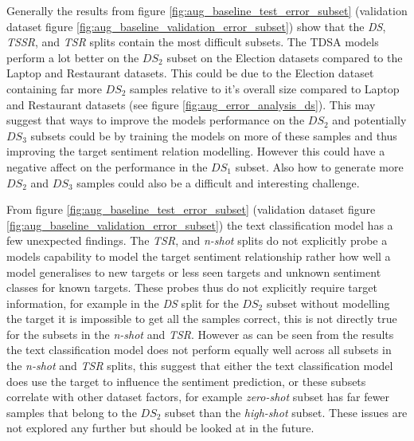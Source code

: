 Generally the results from figure \ref{fig:aug_baseline_test_error_subset} (validation dataset figure \ref{fig:aug_baseline_validation_error_subset}) show that the \textit{DS}, \textit{TSSR}, and \textit{TSR} splits contain the most difficult subsets. The TDSA models perform a lot better on the $DS_2$ subset on the Election datasets compared to the Laptop and Restaurant datasets. This could be due to the Election dataset containing far more $DS_2$ samples relative to it's overall size compared to Laptop and Restaurant datasets (see figure \ref{fig:aug_error_analysis_ds}). This may suggest that ways to improve the models performance on the $DS_2$ and potentially $DS_3$ subsets could be by training the models on more of these samples and thus improving the target sentiment relation modelling. However this could have a negative affect on the performance in the $DS_1$ subset. Also how to generate more $DS_2$ and $DS_3$ samples could also be a difficult and interesting challenge.

From figure \ref{fig:aug_baseline_test_error_subset} (validation dataset figure \ref{fig:aug_baseline_validation_error_subset}) the text classification model has a few unexpected findings. The \textit{TSR}, and \textit{n-shot} splits do not explicitly probe a models capability to model the target sentiment relationship rather how well a model generalises to new targets or less seen targets and unknown sentiment classes for known targets. These probes thus do not explicitly require target information, for example in the \textit{DS} split for the $DS_2$ subset without modelling the target it is impossible to get all the samples correct, this is not directly true for the subsets in the \textit{n-shot} and \textit{TSR}. However as can be seen from the results the text classification model does not perform equally well across all subsets in the \textit{n-shot} and \textit{TSR} splits, this suggest that either the text classification model does use the target to influence the sentiment prediction, or these subsets correlate with other dataset factors, for example \textit{zero-shot} subset has far fewer samples that belong to the $DS_2$ subset than the \textit{high-shot} subset. These issues are not explored any further but should be looked at in the future.

